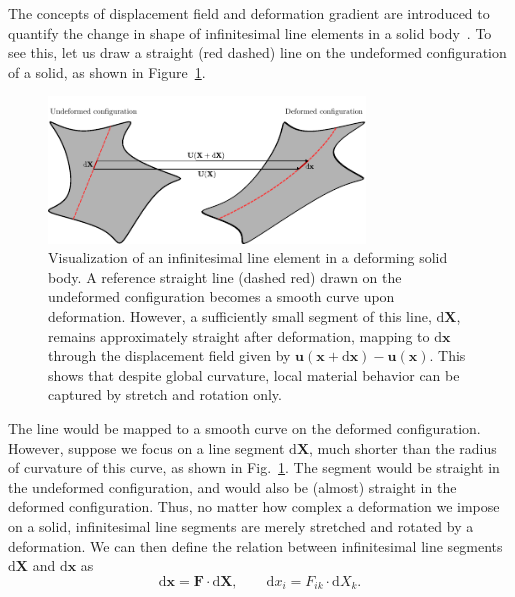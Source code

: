 \documentclass[a4paper,11pt]{article}
\begin{document}
The concepts of displacement field and deformation gradient are introduced to quantify the change in shape of infinitesimal line elements in a solid body~\cite{bonet1997nonlinear}. To see this, let us draw a straight (red dashed) line on the undeformed configuration of a solid, as shown in Figure~\ref{fig:dx}.
\begin{figure}[H]
\centering
\includegraphics[width=0.75\textwidth]{images/dx.pdf}
\caption{Visualization of an infinitesimal line element in a deforming solid body. A reference straight line (dashed red) drawn on the undeformed configuration becomes a smooth curve upon deformation. However, a sufficiently small segment of this line, $\text{d}\mathbf{X}$, remains approximately straight after deformation, mapping to $\text{d}\mathbf{x}$ through the displacement field given by $\mathbf{u}(\mathbf{x}+\text{d}\mathbf{x})-\mathbf{u}(\mathbf{x})$. This shows that despite global curvature, local material behavior can be captured by stretch and rotation only.}
\label{fig:dx}
\end{figure}
The line would be mapped to a smooth curve on the deformed configuration. However, suppose we focus on a line segment $\text{d}\mathbf{X}$, much shorter than the radius of curvature of this curve, as shown in Fig.~\ref{fig:dx}.  The segment would be straight in the undeformed configuration, and would also be (almost) straight in the deformed configuration.  Thus, no matter how complex a deformation we impose on a solid, infinitesimal line segments are merely stretched and rotated by a deformation. We can then define the relation between infinitesimal line segments $\text{d}\mathbf{X}$ and $\text{d}\mathbf{x}$ as
\begin{equation}
\text{d}\mathbf{x}=\mathbf{F}\cdot \text{d}\mathbf{X}, \qquad \text{d}x_i=F_{ik}\cdot \text{d}X_k.
\end{equation}
\end{document}
